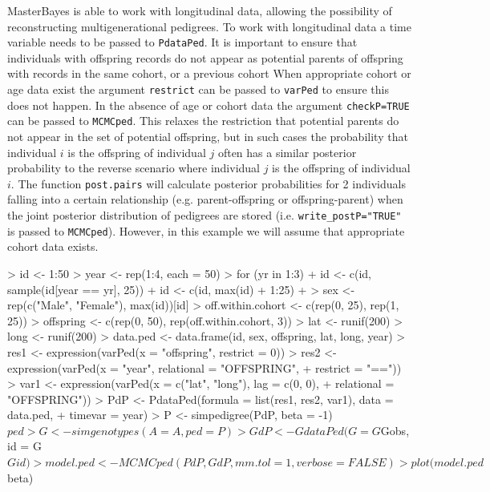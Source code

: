 \documentclass{article}
\begin{document}
MasterBayes is able to work with longitudinal data, allowing the possibility of reconstructing multigenerational pedigrees.  To work with longitudinal data a time variable needs to be passed to \texttt{PdataPed}.  It is important to ensure that individuals with offspring records do not appear as potential parents of offspring with records in the same cohort, or a previous cohort    When appropriate cohort or age data exist the argument \texttt{restrict} can be passed to \texttt{varPed} to ensure this does not happen. In the absence of age or cohort data the argument \texttt{checkP=TRUE} can be passed to \texttt{MCMCped}.  This relaxes the restriction that potential parents do not appear in the set of potential offspring, but in such cases the probability that individual $i$ is the offspring of individual $j$ often has a similar posterior probability to the reverse scenario where individual $j$ is the offspring of individual $i$.  The function \texttt{post.pairs} will calculate posterior probabilities for 2 individuals falling into a certain relationship (e.g. parent-offspring or offspring-parent) when the joint posterior distribution of pedigrees are stored (i.e. \texttt{write\_postP="TRUE"} is passed to \texttt{MCMCped}). However, in this example we will assume that appropriate cohort data exists.

\begin{Schunk}
\begin{Sinput}
> id <- 1:50
> year <- rep(1:4, each = 50)
> for (yr in 1:3) {
+     id <- c(id, sample(id[year == yr], 25))
+     id <- c(id, max(id) + 1:25)
+ }
> sex <- rep(c("Male", "Female"), max(id))[id]
> off.within.cohort <- c(rep(0, 25), rep(1, 25))
> offspring <- c(rep(0, 50), rep(off.within.cohort, 3))
> lat <- runif(200)
> long <- runif(200)
> data.ped <- data.frame(id, sex, offspring, lat, long, year)
> res1 <- expression(varPed(x = "offspring", restrict = 0))
> res2 <- expression(varPed(x = "year", relational = "OFFSPRING", 
+     restrict = "=="))
> var1 <- expression(varPed(x = c("lat", "long"), lag = c(0, 0), 
+     relational = "OFFSPRING"))
> PdP <- PdataPed(formula = list(res1, res2, var1), data = data.ped, 
+     timevar = year)
> P <- simpedigree(PdP, beta = -1)$ped
> G <- simgenotypes(A = A, ped = P)
> GdP <- GdataPed(G = G$Gobs, id = G$Gid)
> model.ped <- MCMCped(PdP, GdP, mm.tol = 1, verbose = FALSE)
> plot(model.ped$beta)
\end{Sinput}
\end{Schunk}
\end{document}
